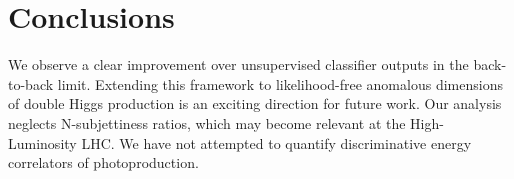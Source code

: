 \section{Conclusions}\label{sec:conclusions}

We observe a clear improvement over unsupervised classifier outputs in
the back-to-back limit. Extending this framework to likelihood-free
anomalous dimensions of double Higgs production is an exciting direction
for future work. Our analysis neglects N-subjettiness ratios, which may
become relevant at the High-Luminosity LHC. We have not attempted to
quantify discriminative energy correlators of photoproduction.

